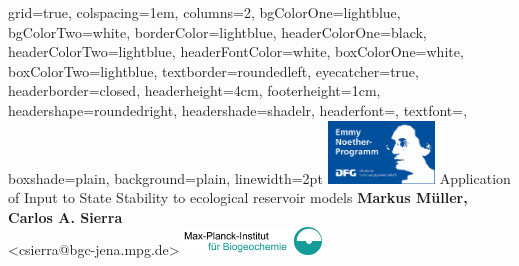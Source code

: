 \documentclass[portrait,final,a0paper,fontscale=0.345,debug]{baposterSAB2018}
\begin{document}



\newcommand{\numberofcolumns}{2}
\begin{poster}%
  {
  grid=true,
  colspacing=1em,
  columns=\numberofcolumns, 
  bgColorOne=lightblue,
  bgColorTwo=white,
  borderColor=lightblue,
  headerColorOne=black,
  headerColorTwo=lightblue,
  headerFontColor=white,
  boxColorOne=white,
  boxColorTwo=lightblue,
  textborder=roundedleft,
  eyecatcher=true,
  headerborder=closed,
  headerheight=4cm,
  footerheight=1cm,
  headershape=roundedright,
  headershade=shadelr,
  headerfont=\Large, %
  textfont={\setlength{\parindent}{1.5em}},
  boxshade=plain,
  background=plain,
  linewidth=2pt
  }
  {\includegraphics[height=4.5em]{images/logos/EmmyNoether}
  } 
  {Application of Input to State Stability to ecological reservoir models}
  {
 {\bf  Markus M\"uller, Carlos A. Sierra}   \\
  {\small  <csierra@bgc-jena.mpg.de> } %
  }
  {%
   \includegraphics[height=2em]{BGClogo}
  }
  {
}
\end{poster}
\end{document}
